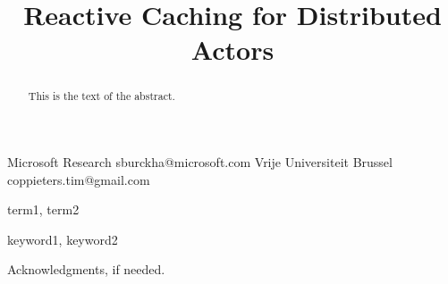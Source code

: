 \documentclass[preprint,numbers,10pt]{sigplanconf}
\begin{document}
\setlength{\pdfpageheight}{\paperheight}
\setlength{\pdfpagewidth}{\paperwidth}




\title{Reactive Caching for Distributed Actors}
\subtitle{}

           {Microsoft Research}
           {sburckha@microsoft.com}
           {Vrije Universiteit Brussel}
           {coppieters.tim@gmail.com}

\maketitle

\begin{abstract}
This is the text of the abstract.
\end{abstract}


\terms
term1, term2

\keywords
keyword1, keyword2








 

 

\acks

Acknowledgments, if needed.






\end{document}
